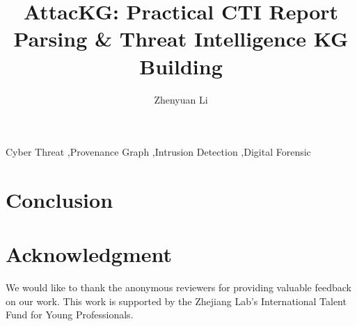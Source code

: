 \documentclass[final,5p,twocolumn]{elsarticle}
\begin{document}
\begin{frontmatter}

\title{AttacKG: Practical CTI Report Parsing \& Threat Intelligence KG Building}


\author[label1]{Zhenyuan Li}

\address[label1]{Zhejiang University, China}


\begin{abstract}

\end{abstract}

\begin{keyword}
Cyber Threat \sep Provenance Graph \sep Intrusion Detection \sep Digital Forensic
\end{keyword}

\end{frontmatter}









\section{Conclusion}
\label{sec:conclusion}


\section*{Acknowledgment}
We would like to thank the anonymous reviewers for providing valuable feedback on our work. This work is supported by the Zhejiang Lab’s International Talent Fund for Young Professionals.



 

\end{document}

